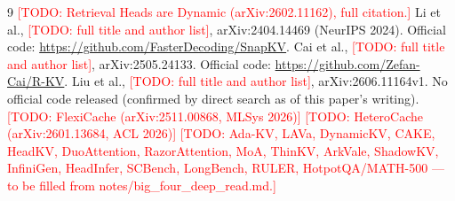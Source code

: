 \documentclass[11pt]{article}
\newcommand{\NEEDPROSE}[1]{\textcolor{red}{[TODO: #1]}}
\begin{document}
\begin{thebibliography}{9}
    \NEEDPROSE{Retrieval Heads are Dynamic (arXiv:2602.11162), full citation.}
    Li et al., \NEEDPROSE{full title and author list}, arXiv:2404.14469
    (NeurIPS 2024). Official code:
    \url{https://github.com/FasterDecoding/SnapKV}.
    Cai et al., \NEEDPROSE{full title and author list}, arXiv:2505.24133.
    Official code: \url{https://github.com/Zefan-Cai/R-KV}.
    Liu et al., \NEEDPROSE{full title and author list}, arXiv:2606.11164v1.
    No official code released (confirmed by direct search as of this
    paper's writing).
\NEEDPROSE{FlexiCache (arXiv:2511.00868, MLSys 2026)}
\NEEDPROSE{HeteroCache (arXiv:2601.13684, ACL 2026)}
\NEEDPROSE{Ada-KV, LAVa, DynamicKV, CAKE, HeadKV, DuoAttention, RazorAttention, MoA, ThinKV, ArkVale, ShadowKV, InfiniGen, HeadInfer, SCBench, LongBench, RULER, HotpotQA/MATH-500 --- to be filled from notes/big\_four\_deep\_read.md.}
\end{thebibliography}
\end{document}
